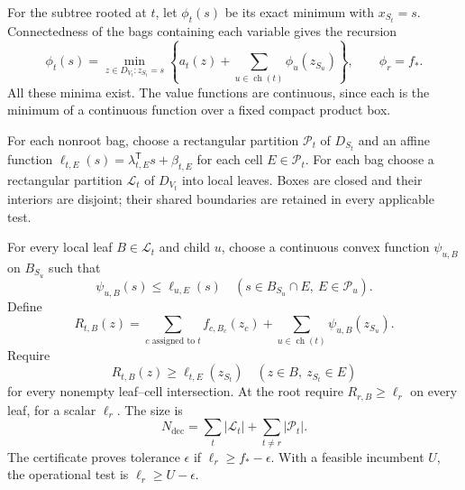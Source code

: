 For the subtree rooted at $t$, let $\phi_t(s)$ be its exact minimum with
$x_{S_t}=s$. Connectedness of the bags containing each variable gives the
recursion
\begin{equation}\label{decomp:exact-recursion}
 \phi_t(s)=\min_{z\in D_{V_t}:z_{S_t}=s}
 \left\{a_t(z)+\sum_{u\in\operatorname{ch}(t)}\phi_u(z_{S_u})\right\},
 \qquad \phi_r=f_*.
\end{equation}
All these minima exist. The value functions are continuous, since each is
the minimum of a continuous function over a fixed compact product box.

\begin{definition}\label{decomp:certificate}
For each nonroot bag, choose a rectangular partition $\mathcal P_t$ of
$D_{S_t}$ and an affine function
$\ell_{t,E}(s)=\lambda_{t,E}^{\mathsf T}s+\beta_{t,E}$ for each cell
$E\in\mathcal P_t$. For each bag choose a rectangular partition
$\mathcal L_t$ of $D_{V_t}$ into local leaves. Boxes are closed and their
interiors are disjoint; their shared boundaries are retained in every
applicable test.

For every local leaf $B\in\mathcal L_t$ and child $u$, choose a continuous
convex function $\psi_{u,B}$ on $B_{S_u}$ such that
\begin{equation}\label{decomp:child-test}
 \psi_{u,B}(s)\le\ell_{u,E}(s)
 \quad(s\in B_{S_u}\cap E,\ E\in\mathcal P_u).
\end{equation}
Define
\[
 R_{t,B}(z)=\sum_{c\text{ assigned to }t}f_{c,B_c}(z_c)
            +\sum_{u\in\operatorname{ch}(t)}\psi_{u,B}(z_{S_u}).
\]
Require
\begin{equation}\label{decomp:leaf-test}
 R_{t,B}(z)\ge\ell_{t,E}(z_{S_t})
 \quad(z\in B,\ z_{S_t}\in E)
\end{equation}
for every nonempty leaf--cell intersection. At the root require
$R_{r,B}\ge\ell_r$ on every leaf, for a scalar $\ell_r$.
The size is
\[
 N_{\mathrm{dec}}=\sum_t|\mathcal L_t|+
                         \sum_{t\ne r}|\mathcal P_t|.
\]
The certificate proves tolerance $\epsilon$ if $\ell_r\ge f_*-\epsilon$.
With a feasible incumbent $U$, the operational test is
$\ell_r\ge U-\epsilon$.
\end{definition}

